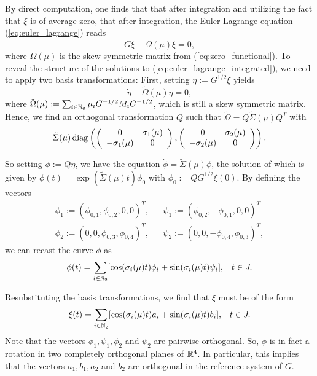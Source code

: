 By direct computation, one finds that that after integration and utilizing the fact that $\xi$ is of average zero, that after integration, the Euler-Lagrange equation (\ref{eq:euler_lagrange}) reads
\begin{equation}
\label{eq:euler_lagrange_integrated}
G \dot{\xi} - \Omega(\mu) \xi = 0,
\end{equation}
where $\Omega(\mu)$ is the skew symmetric matrix from (\ref{eq:zero_functional}). To reveal the structure of the solutions to (\ref{eq:euler_lagrange_integrated}), we need to apply two basis transformations: First, setting $\eta := G^{1/2} \xi$ yields
\begin{equation}
\dot{\eta} - \tilde{\Omega}(\mu) \eta = 0,
\end{equation}
where $\tilde{\Omega}(\mu) := \sum_{i \in \mathbb{N}_6} \mu_i G^{-1/2} M_i G^{-1/2}$, which is still a skew symmetric matrix. Hence, we find an orthogonal transformation $Q$ such that $\tilde{\Omega} = Q \tilde{\Sigma}(\mu) Q^T$ with
\begin{align}
	\tilde{\Sigma}(\mu) \operatorname{diag} \left (\left( \begin{array}{cc}
0 & \sigma_1(\mu) \\ 
- \sigma_1(\mu) & 0
\end{array} \right ) , \left ( \begin{array}{cc}
0 & \sigma_2(\mu) \\
- \sigma_2(\mu) & 0
\end{array} \right ) \right ).
\end{align}

So setting $\phi := Q \eta$, we have the equation $\dot{\phi} = \tilde{\Sigma}(\mu) \phi$, the solution of which is given by $\phi(t) = \exp \left ( \tilde{\Sigma}(\mu) t \right )\phi_0$ with $\phi_0 := QG^{1/2}\xi(0)$. By defining the vectors
\begin{align}
	\phi_1 := (\phi_{0,1}, \phi_{0,2}, 0, 0)^T, & & \psi_1 := (\phi_{0,2}, - \phi_{0,1}, 0, 0)^T\\
	\phi_2 := (0,0,\phi_{0,3}, \phi_{0, 4})^T, & & \psi_2 := (0,0,- \phi_{0,4}, \phi_{0,3})^T,
\end{align}
we can recast the curve $\phi$ as
\begin{eqnarray}
\phi(t) = \sum_{i \in \mathbb{N}_2} [\cos(\sigma_i(\mu)t) \phi_i + \sin(\sigma_i(\mu)t) \psi_i], & & t \in J.
\end{eqnarray}

Resubstituting the basis transformations, we find that $\xi$ must be of the form
\begin{eqnarray}
\label{eq:general_optimal_curve}
\xi(t) = \sum_{i \in \mathbb{N}_2} [\cos(\sigma_i(\mu)t) a_i + \sin(\sigma_i(\mu)t) b_i], & & t \in J.
\end{eqnarray}
Note that the vectors $\phi_1, \psi_1, \phi_2$ and $\psi_2$ are pairwise orthogonal. So, $\phi$ is in fact a rotation in two completely orthogonal planes of $\mathbb{R}^4$. In particular, this implies that the vectors $a_1, b_1, a_2$ and $b_2$ are orthogonal in the reference system of $G$.

